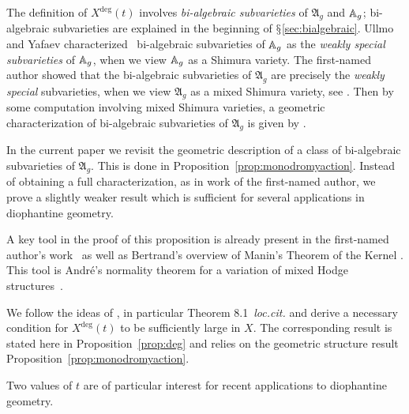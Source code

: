 \documentclass[12pt,oneside]{amsart}
\begin{document}
The definition of  $X^{\mathrm{deg}}(t)$ involves
 \textit{bi-algebraic subvarieties} of $\mathfrak{A}_g$
and ${\mathbb{A}}_g$; bi-algebraic subvarieties are 
explained in the beginning of $\mathsection$\ref{sec:bialgebraic}.
 Ullmo and Yafaev characterized~\cite{UYweaklyspecial} bi-algebraic subvarieties
of ${\mathbb{A}}_g$ as the \textit{weakly special subvarieties} of ${\mathbb{A}}_g$,
when we view ${\mathbb{A}}_g$ as
a Shimura variety.
The first-named author \cite[Corollary~8.3]{GaoCrelle}
showed that the bi-algebraic subvarieties of $\mathfrak{A}_g$ are
precisely the \textit{weakly special} subvarieties, when we view
$\mathfrak{A}_g$ as a mixed Shimura variety, see
\cite[Definition~4.1(b)]{Pink05}. Then by some computation involving
mixed Shimura varieties, a geometric characterization of bi-algebraic
subvarieties of $\mathfrak{A}_g$ is given by
\cite[Proposition~1.1]{GaoCrelle}.

In the current paper we revisit the geometric description of a class of
bi-algebraic subvarieties of $\mathfrak{A}_g$. This is done in
Proposition~\ref{prop:monodromyaction}. Instead of obtaining a full
characterization, as in work of the first-named author,
we prove a slightly weaker result which is
sufficient for several applications in diophantine geometry.

A key tool in the proof of this proposition is already present in
the first-named author's work~\cite[$\mathsection$8]{GaoCrelle} as
well as Bertrand's overview of Manin's Theorem of the Kernel
\cite{Bertrand:Manin2020}. This tool is Andr\'e's normality theorem
for a variation of mixed Hodge structures~\cite{Andre92}.

We follow the ideas of \cite{GaoBettiRank}, in particular Theorem
8.1~\textit{loc.cit.} and derive a necessary
condition for $X^{\mathrm{deg}}(t)$ to be sufficiently large in $X$. The corresponding
result is stated here in Proposition~\ref{prop:deg} and relies on the
geometric structure result Proposition~\ref{prop:monodromyaction}.

Two values of $t$ are of particular interest for recent applications
to diophantine geometry.
\end{document}
